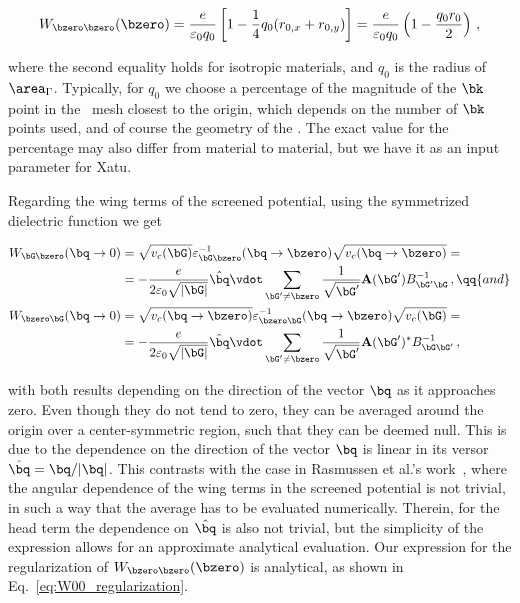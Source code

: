 \begin{equation}
    \label{eq:W00_regularization}
    W_{\bzero \bzero} (\bzero) = \frac{e}{\varepsilon_0 q_0} \left[1 - \frac{1}{4} q_0 (r_{0,x}+r_{0,y})\right] =  \frac{e}{\varepsilon_0 q_0} \left(1 - \frac{q_0 r_0}{2} \right) \,,
\end{equation}

\noindent where the second equality holds for isotropic materials, and $q_0$ is the radius of $\area_{\Gamma}$.
Typically, for $q_0$ we choose a percentage of the magnitude of the $\bk$ point in the \bz~mesh closest to the origin, which depends on the number of $\bk$ points used, and of course the geometry of the \bz\@.
The exact value for the percentage may also differ from material to material, but we have it as an input parameter for Xatu.

Regarding the wing terms of the screened potential, using the symmetrized dielectric function we get

\begin{align}
    W_{\bG \bzero} (\bq \to 0) & =  \sqrt{v_c(\bG)} \varepsilon^{-1}_{\bG \bzero} (\bq \to \bzero) \sqrt{v_c (\bq \to \bzero)} = \notag \\
                               & = -\frac{e}{2\varepsilon_0\sqrt{|\bG|}} \hat{\bq} \vdot \sum_{\bG' \neq \bzero} \frac{1}{ \sqrt{\bG'}} \mathbf{A}(\bG') B^{-1}_{\bG' \bG}\,, \qq{and} \\
    W_{\bzero \bG} (\bq \to 0) & =  \sqrt{v_c (\bq \to \bzero)} \varepsilon^{-1}_{\bzero \bG} (\bq \to \bzero) \sqrt{v_c(\bG)}  =  \notag \\
                               & = -\frac{e}{2\varepsilon_0\sqrt{|\bG|}} \hat{\bq} \vdot \sum_{\bG' \neq \bzero} \frac{1}{ \sqrt{\bG'}} \mathbf{A}(\bG')^* B^{-1}_{\bG \bG'}\,, 
\end{align}

\noindent with both results depending on the direction of the vector $\bq$ as it approaches zero.
Even though they do not tend to zero, they can be averaged around the origin over a center-symmetric region, such that they can be deemed null.
This is due to the dependence on the direction of the vector $\bq$ is linear in its versor $\hat{\bq} = \bq/|\bq|$.
This contrasts with the case in Rasmussen et al.'s work~\cite{Rasmussen_Schmidt_Winther_Thygesen_2016}, where the angular dependence of the wing terms in the screened potential is not trivial, in such a way that the average has to be evaluated numerically.
Therein, for the head term the dependence on $\hat{\bq}$ is also not trivial, but the simplicity of the expression allows for an approximate analytical evaluation.
Our expression for the regularization of $W_{\bzero \bzero}(\bzero)$ is analytical, as shown in Eq.~\eqref{eq:W00_regularization}.

